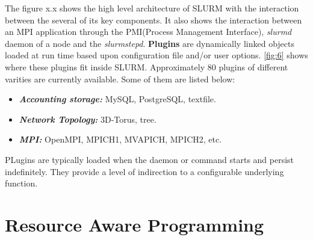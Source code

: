 The figure x.x shows the high level architecture of SLURM with the interaction between the several of its key components. It also shows the interaction between an MPI application through the PMI(Process Management Interface), \textit{slurmd} daemon of a node and the \textit{slurmstepd}.
\textbf{Plugins} are dynamically linked objects loaded at run time based upon configuration file and/or user options. \ref{fig:6} shows where these plugins fit inside SLURM. Approximately $80$ plugins of different varities are currently available. Some of them are listed below:
\begin{itemize}
\item \textbf{\textit{Accounting storage:}} MySQL, PostgreSQL, textfile.
\item \textbf{\textit{Network Topology:}} 3D-Torus, tree.
\item \textbf{\textit{MPI:}} OpenMPI, MPICH1, MVAPICH, MPICH2, etc.
\end{itemize}
PLugins are typically loaded when the daemon or command starts and persist indefinitely. They provide a level of indirection to a configurable underlying function.
\section{Resource Aware Programming}
